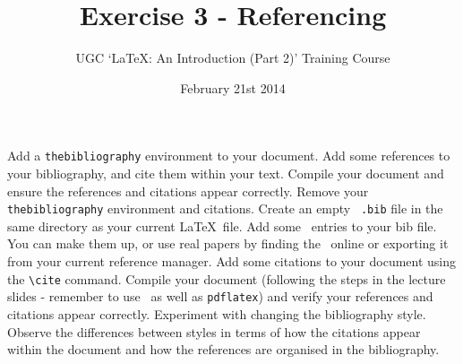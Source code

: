 \documentclass[11pt]{exam}
\title{Exercise 3 - Referencing}
\author{UGC `\LaTeX: An Introduction (Part 2)' Training Course}
\date{February 21st 2014}
\begin{document}
\maketitle


\vspace{0.2in}

\begin{questions}

\question
Add a \texttt{thebibliography} environment to your document.
\question
Add some references to your bibliography, and cite them within your text.
\question
Compile your document and ensure the references and citations appear correctly.
\question
Remove your \texttt{thebibliography} environment and citations. Create an empty ~\texttt{.bib} file in the same directory as your current \LaTeX\ file.
\question
Add some \BibTeX\ entries to your bib file. You can make them up, or use real papers by finding the \BibTeX\ online or exporting it from your current reference manager.
\question
Add some citations to your document using the \texttt{{\textbackslash}cite} command.
\question
Compile your document (following the steps in the lecture slides - remember to use \BibTeX\ as well as \texttt{pdflatex}) and verify your references and citations appear correctly.
\question
Experiment with changing the bibliography style. Observe the differences between styles in terms of how the citations appear within the document and how the references are organised in the bibliography.
\end{questions}
\end{document}
